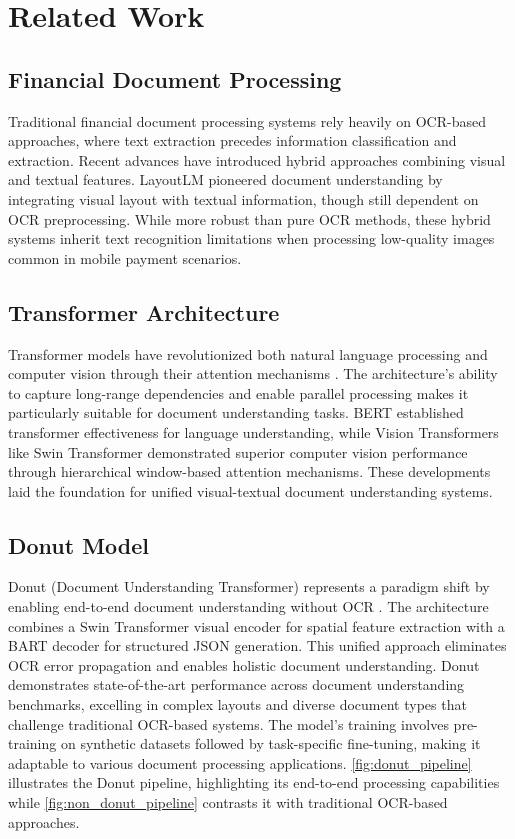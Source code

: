 \section{Related Work}

\subsection{Financial Document Processing}
Traditional financial document processing systems rely heavily on OCR-based approaches, where text extraction precedes information classification and extraction. Recent advances have introduced hybrid approaches combining visual and textual features. LayoutLM \cite{xu2020layoutlm} pioneered document understanding by integrating visual layout with textual information, though still dependent on OCR preprocessing. While more robust than pure OCR methods, these hybrid systems inherit text recognition limitations when processing low-quality images common in mobile payment scenarios.

\subsection{Transformer Architecture}
Transformer models have revolutionized both natural language processing and computer vision through their attention mechanisms \cite{vaswani2017attention}. The architecture's ability to capture long-range dependencies and enable parallel processing makes it particularly suitable for document understanding tasks. BERT \cite{koroteev2021bert} established transformer effectiveness for language understanding, while Vision Transformers like Swin Transformer \cite{liu2021swin} demonstrated superior computer vision performance through hierarchical window-based attention mechanisms. These developments laid the foundation for unified visual-textual document understanding systems.

\subsection{Donut Model}
Donut (Document Understanding Transformer) represents a paradigm shift by enabling end-to-end document understanding without OCR \cite{kim2021donut}. The architecture combines a Swin Transformer visual encoder for spatial feature extraction with a BART decoder \cite{lewis2019bart} for structured JSON generation. This unified approach eliminates OCR error propagation and enables holistic document understanding. Donut demonstrates state-of-the-art performance across document understanding benchmarks, excelling in complex layouts and diverse document types that challenge traditional OCR-based systems. The model's training involves pre-training on synthetic datasets followed by task-specific fine-tuning, making it adaptable to various document processing applications. \autoref{fig:donut_pipeline} illustrates the Donut pipeline, highlighting its end-to-end processing capabilities while \autoref{fig:non_donut_pipeline} contrasts it with traditional OCR-based approaches.

